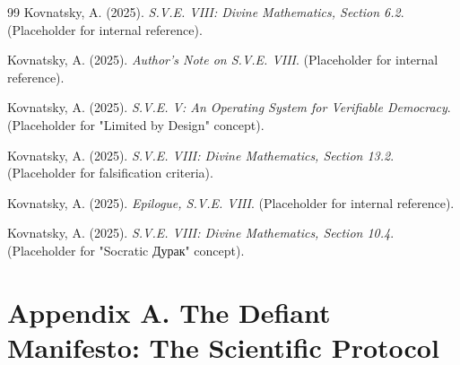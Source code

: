 \documentclass[11pt,a4paper]{article}
\theoremstyle{definition}
\theoremstyle{remark}
\begin{document}
\begin{small}
\begin{enumerate}
\begin{protocol}
\begin{thebibliography}{99}
Kovnatsky, A. (2025). \textit{S.V.E. VIII: Divine Mathematics, Section 6.2}. (Placeholder for internal reference).

Kovnatsky, A. (2025). \textit{Author's Note on S.V.E. VIII}. (Placeholder for internal reference).

Kovnatsky, A. (2025). \textit{S.V.E. V: An Operating System for Verifiable Democracy}. (Placeholder for "Limited by Design" concept).

Kovnatsky, A. (2025). \textit{S.V.E. VIII: Divine Mathematics, Section 13.2}. (Placeholder for falsification criteria).

Kovnatsky, A. (2025). \textit{Epilogue, S.V.E. VIII}. (Placeholder for internal reference).

Kovnatsky, A. (2025). \textit{S.V.E. VIII: Divine Mathematics, Section 10.4}. (Placeholder for "Socratic Дурак" concept).

\end{thebibliography}


\clearpage %
\appendix



\section*{Appendix A. The Defiant Manifesto: The Scientific Protocol}
\label{app:manifesto}

\vspace{1em}

\noindent{}


\end{protocol}
\end{enumerate}
\end{small}
\end{document}
